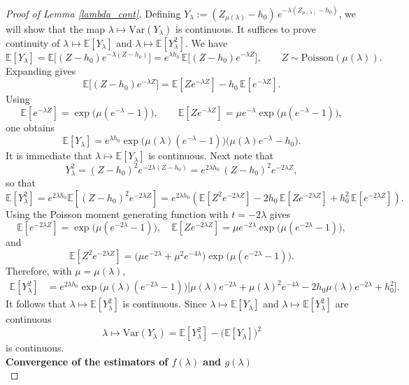 \documentclass[10pt,a4paper]{amsart}
\begin{document}
\begin{proof}[Proof of Lemma \ref{lambda_cont}]
Defining $Y_\lambda := (Z_{\mu(\lambda)}-h_0)\,e^{-\lambda(Z_{\mu(\lambda)}-h_0)}$, we will show that the map $
\lambda \mapsto \mathrm{Var}(Y_\lambda)
$
is continuous. It suffices to prove continuity of $\lambda\mapsto \mathbb{E}[Y_\lambda]$
and $\lambda\mapsto \mathbb{E}[Y_\lambda^2]$. We have
\[
\mathbb{E}[Y_\lambda]
=\mathbb{E}\Big[(Z-h_0)e^{-\lambda(Z-h_0)}\Big]
= e^{\lambda h_0}\,\mathbb{E}\Big[(Z-h_0)e^{-\lambda Z}\Big],
\qquad Z\sim \mathrm{Poisson}(\mu(\lambda)).
\]
Expanding gives
\[
\mathbb{E}\Big[(Z-h_0)e^{-\lambda Z}\Big]
=\mathbb{E}[Z e^{-\lambda Z}] - h_0\,\mathbb{E}[e^{-\lambda Z}].
\]
Using
\[
\mathbb{E}[e^{-\lambda Z}]=\exp\!\big(\mu(e^{-\lambda}-1)\big),
\qquad
\mathbb{E}[Z e^{-\lambda Z}]
=\mu e^{-\lambda}\exp\!\big(\mu(e^{-\lambda}-1)\big),
\]
one obtains
\[
\mathbb{E}[Y_\lambda]
= e^{\lambda h_0}\exp\!\big(\mu(\lambda)(e^{-\lambda}-1)\big)\Big(\mu(\lambda)e^{-\lambda}-h_0\Big).
\]
It is immediate that
$\lambda\mapsto \mathbb{E}[Y_\lambda]$ is continuous. Next note that
\[
Y_\lambda^2 = (Z-h_0)^2 e^{-2\lambda(Z-h_0)}
= e^{2\lambda h_0}\,(Z-h_0)^2 e^{-2\lambda Z},
\]
so that
\[
\mathbb{E}[Y_\lambda^2]
= 
e^{2\lambda h_0}\mathbb{E}[(Z-h_0)^2 e^{-2\lambda Z}]
=e^{2\lambda h_0}(\mathbb{E}[Z^2 e^{-2\lambda Z}]
-2h_0\,\mathbb{E}[Z e^{-2\lambda Z}]
+h_0^2\,\mathbb{E}[e^{-2\lambda Z}]).
\]
Using the Poisson moment generating function with $t=-2\lambda$ gives
\[
\mathbb{E}[e^{-2\lambda Z}]
=\exp\!\big(\mu(e^{-2\lambda}-1)\big),
\quad
\mathbb{E}[Z e^{-2\lambda Z}]
=\mu e^{-2\lambda}\exp\!\big(\mu(e^{-2\lambda}-1)\big),
\]
and
\[
\mathbb{E}[Z^2 e^{-2\lambda Z}]
=\big(\mu e^{-2\lambda}+\mu^2 e^{-4\lambda}\big)\exp\!\big(\mu(e^{-2\lambda}-1)\big).
\]
Therefore, with $\mu=\mu(\lambda)$,
\begin{align*}
\mathbb{E}[Y_\lambda^2]
&= e^{2\lambda h_0}\exp\!\big(\mu(\lambda)(e^{-2\lambda}-1)\big)
\Big[
\mu(\lambda)e^{-2\lambda}
+\mu(\lambda)^2 e^{-4\lambda}
-2h_0\mu(\lambda)e^{-2\lambda}
+h_0^2
\Big].
\end{align*}
It follows that $\lambda\mapsto \mathbb{E}[Y_\lambda^2]$ is continuous.
Since $\lambda\mapsto \mathbb{E}[Y_\lambda]$ and $\lambda\mapsto \mathbb{E}[Y_\lambda^2]$
are continuous
\[
\lambda\mapsto \mathrm{Var}(Y_\lambda)
=\mathbb{E}[Y_\lambda^2]-\big(\mathbb{E}[Y_\lambda]\big)^2
\]
is continuous.\\

\textbf{Convergence of the estimators of $f(\lambda)$ and $g(\lambda)$}\\




\end{proof}
\end{document}
